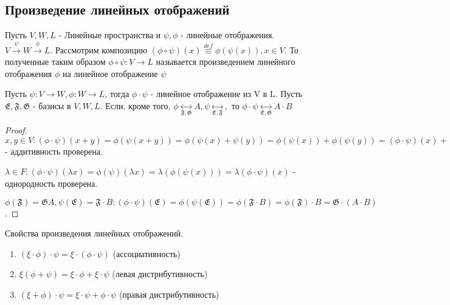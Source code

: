 \subsection{Произведение линейных отображений}
Пусть \(V, W, L\) - Линейные пространства и \(\psi, \phi\) - линейные отображения. \(V\overset{\psi}{\longrightarrow} W \overset{\phi}{\longrightarrow} L\). Рассмотрим композицию \((\phi\circ \psi)(x)\overset{def}{\equiv} \phi(\psi(x)), x\in V\). То полученные таким образом \(\phi\circ\psi:V\to L\) называется произведением линейного отображения $\phi$ на линейное отображение $\psi$
\begin{theorem}
	Пусть $\psi:V\to W, \phi:W\to L$, тогда \(\phi\cdot\psi \) - линейное отображение из V в L. Пусть \(\mathfrak{E}, \mathfrak{F}, \mathfrak{G}\) - базисы в \(V, W, L\). Если, кроме того, \(\phi\underset{\mathfrak{F}, \mathfrak{G}}{\longleftrightarrow} A, \psi\underset{\mathfrak{E}, \mathfrak{F}}{\longleftrightarrow},\) то \(\phi\cdot\psi\underset{\mathfrak{E}, \mathfrak{G}}{\longleftrightarrow} A\cdot B\)
\end{theorem}
\begin{proof}
	\(x,y \in V: (\phi\cdot \psi)(x+y) = \phi(\psi(x+y)) = \phi(\psi(x) + \psi(y)) = \phi(\psi(x))+\phi(\psi(y)) = (\phi\cdot\psi)(x) + (\phi\cdot\psi)(y)\) - аддитивность проверена. 
	
	\(\lambda \in F: (\phi\cdot\psi)(\lambda x) = \phi(\psi)(\lambda x) = \lambda (\phi(\psi(x))) = \lambda (\phi\cdot\psi)(x)\) - однородность проверена. 
	
	\(\phi(\mathfrak{F}) = \mathfrak{G}A, \psi(\mathfrak{E}) = \mathfrak{F}\cdot B: (\phi\cdot \psi)(\mathfrak{E}) = \phi(\psi(\mathfrak{E})) = \phi(\mathfrak{F}\cdot B) = \phi(\mathfrak{F})\cdot B = \mathfrak{G}\cdot(A\cdot B)\).
\end{proof}
\begin{corollary}
	Свойства произведения линейных отображений. 
	\begin{enumerate}
		\item \((\xi\cdot \phi)\cdot\psi = \xi\cdot(\phi\cdot\psi)\) (ассоциативность)
		\item \(\xi(\phi+\psi) = \xi\cdot\phi + \xi\cdot\psi\) (левая дистрибутивность)
		\item \((\xi + \phi)\cdot\psi = \xi\cdot\psi + \phi\cdot\psi\) (правая дистрибутивность)
	\end{enumerate}
\end{corollary}

